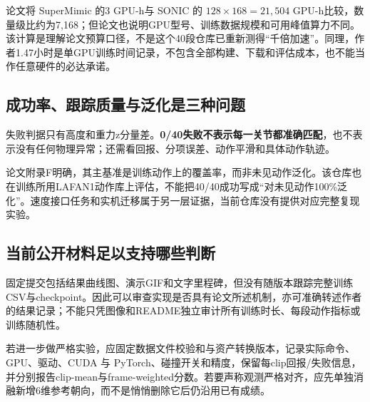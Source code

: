 论文将 SuperMimic 的3 GPU-h与 SONIC 的 $128\times168=21,504$ GPU-h比较，数量级比约为7,168；但论文也说明GPU型号、训练数据规模和可用峰值算力不同。该计算是理解论文预算口径，不是这个40段仓库已重新测得“千倍加速”。同理，作者1.47小时是单GPU训练时间记录，不包含全部构建、下载和评估成本，也不能当作任意硬件的必达承诺。

\subsection{成功率、跟踪质量与泛化是三种问题}
失败判据只有高度和重力z分量差。\textbf{0/40失败不表示每一关节都准确匹配}，也不表示没有任何物理异常；还需看回报、分项误差、动作平滑和具体动作轨迹。

论文附录F明确，其主基准是训练动作上的覆盖率，而非未见动作泛化。该仓库也在训练所用LAFAN1动作库上评估，不能把40/40成功写成“对未见动作100\%泛化”。速度接口任务和实机迁移属于另一层证据，当前仓库没有提供对应完整复现实验。

\subsection{当前公开材料足以支持哪些判断}
固定提交包括结果曲线图、演示GIF和文字里程碑，但没有随版本跟踪完整训练CSV与checkpoint。因此可以审查实现是否具有论文所述机制，亦可准确转述作者的结果记录；不能只凭图像和README独立审计所有训练时长、每段动作指标或训练随机性。

若进一步做严格实验，应固定数据文件校验和与资产转换版本，记录实际命令、GPU、驱动、CUDA 与 PyTorch、碰撞开关和精度，保留每clip回报/失败信息，并分别报告clip-mean与frame-weighted分数。若要声称观测严格对齐，应先单独消融新增6维参考朝向，而不是悄悄删除它后仍沿用已有成绩。
